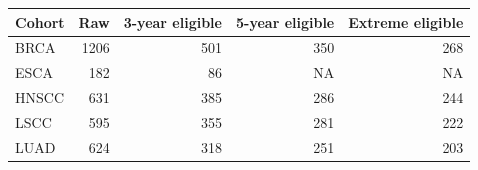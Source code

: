 \begin{tabular}{lrrrr}
\toprule
Cohort & Raw & 3-year eligible & 5-year eligible & Extreme eligible \\
\midrule
BRCA & 1206 & 501 & 350 & 268 \\
ESCA & 182 & 86 & NA & NA \\
HNSCC & 631 & 385 & 286 & 244 \\
LSCC & 595 & 355 & 281 & 222 \\
LUAD & 624 & 318 & 251 & 203 \\
\bottomrule
\end{tabular}
